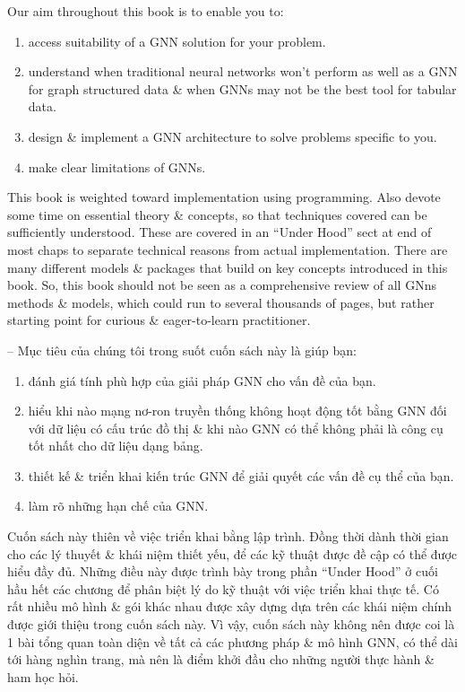 \documentclass{article}
\begin{document}
\begin{itemize}
\begin{itemize}
        Our aim throughout this book is to enable you to:
        \begin{enumerate}
            \item access suitability of a GNN solution for your problem.
            \item understand when traditional neural networks won't perform as well as a GNN for graph structured data \& when GNNs may not be the best tool for tabular data.
            \item design \& implement a GNN architecture to solve problems specific to you.
            \item make clear limitations of GNNs.
        \end{enumerate}
        This book is weighted toward implementation using programming. Also devote some time on essential theory \& concepts, so that techniques covered can be sufficiently understood. These are covered in an ``Under Hood'' sect at end of most chaps to separate technical reasons from actual implementation. There are many different models \& packages that build on key concepts introduced in this book. So, this book should not be seen as a comprehensive review of all GNns methods \& models, which could run to several thousands of pages, but rather starting point for curious \& eager-to-learn practitioner.

        -- Mục tiêu của chúng tôi trong suốt cuốn sách này là giúp bạn:
        \begin{enumerate}
            \item đánh giá tính phù hợp của giải pháp GNN cho vấn đề của bạn.
            \item hiểu khi nào mạng nơ-ron truyền thống không hoạt động tốt bằng GNN đối với dữ liệu có cấu trúc đồ thị \& khi nào GNN có thể không phải là công cụ tốt nhất cho dữ liệu dạng bảng.
            \item thiết kế \& triển khai kiến trúc GNN để giải quyết các vấn đề cụ thể của bạn.
            \item làm rõ những hạn chế của GNN.
        \end{enumerate}
        Cuốn sách này thiên về việc triển khai bằng lập trình. Đồng thời dành thời gian cho các lý thuyết \& khái niệm thiết yếu, để các kỹ thuật được đề cập có thể được hiểu đầy đủ. Những điều này được trình bày trong phần ``Under Hood'' ở cuối hầu hết các chương để phân biệt lý do kỹ thuật với việc triển khai thực tế. Có rất nhiều mô hình \& gói khác nhau được xây dựng dựa trên các khái niệm chính được giới thiệu trong cuốn sách này. Vì vậy, cuốn sách này không nên được coi là 1 bài tổng quan toàn diện về tất cả các phương pháp \& mô hình GNN, có thể dài tới hàng nghìn trang, mà nên là điểm khởi đầu cho những người thực hành \& ham học hỏi.


\end{itemize}
\end{itemize}
\end{document}
